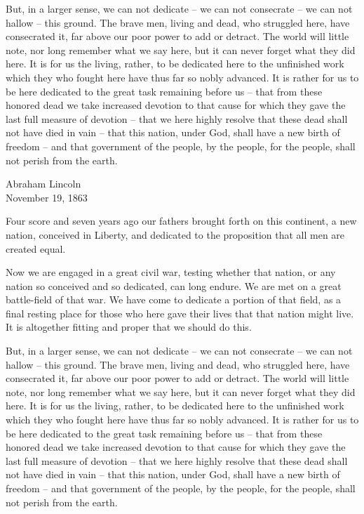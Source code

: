 \documentclass[11pt]{article}
\begin{document}
But, in a larger sense, we can not dedicate -- we can not consecrate -- we can not hallow -- this ground. The brave men, living and dead, who struggled here, have consecrated it, far above our poor power to add or detract. The world will little note, nor long remember what we say here, but it can never forget what they did here. It is for us the living, rather, to be dedicated here to the unfinished work which they who fought here have thus far so nobly advanced. It is rather for us to be here dedicated to the great task remaining before us -- that from these honored dead we take increased devotion to that cause for which they gave the last full measure of devotion -- that we here highly resolve that these dead shall not have died in vain -- that this nation, under God, shall have a new birth of freedom -- and that government of the people, by the people, for the people, shall not perish from the earth.

Abraham Lincoln\\
November 19, 1863

\lfoot{\thepage}



Four score and seven years ago our fathers brought forth on this continent, a new nation, conceived in Liberty, and dedicated to the proposition that all men are created equal.

Now we are engaged in a great civil war, testing whether that nation, or any nation so conceived and so dedicated, can long endure. We are met on a great battle-field of that war. We have come to dedicate a portion of that field, as a final resting place for those who here gave their lives that that nation might live. It is altogether fitting and proper that we should do this.

But, in a larger sense, we can not dedicate -- we can not consecrate -- we can not hallow -- this ground. The brave men, living and dead, who struggled here, have consecrated it, far above our poor power to add or detract. The world will little note, nor long remember what we say here, but it can never forget what they did here. It is for us the living, rather, to be dedicated here to the unfinished work which they who fought here have thus far so nobly advanced. It is rather for us to be here dedicated to the great task remaining before us -- that from these honored dead we take increased devotion to that cause for which they gave the last full measure of devotion -- that we here highly resolve that these dead shall not have died in vain -- that this nation, under God, shall have a new birth of freedom -- and that government of the people, by the people, for the people, shall not perish from the earth.
\end{document}
